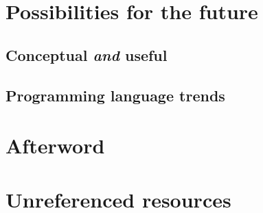 \documentclass[11pt]{article}
\begin{document}
\section{Possibilities for the future}

\subsection{Conceptual \emph{and} useful}

\subsection{Programming language trends}

\newpage
\section*{Afterword}

\newpage
\section*{Unreferenced resources}


\newpage
\printbibliography[heading=bibintoc, title={References}]
\end{document}
